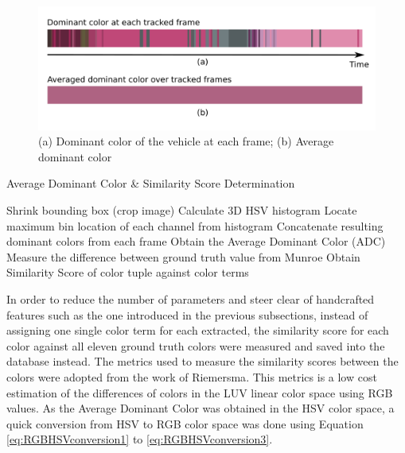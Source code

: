 \begin{figure}[hbt!]\centering
\includegraphics[width=.9\textwidth]{image/general/ADC.png}
\caption{(a) Dominant color of the vehicle at each frame; (b) Average dominant color}
\label{fig:ADC}
\end{figure}




\begin{algorithm}[!h]
  \caption{Average Dominant Color \& Similarity Score Determination}
  \label{algo:ADC}
  \begin{algorithmic}[1]
        \State Shrink bounding box (crop image)
        \State Calculate 3D HSV histogram
        \State Locate maximum bin location of each channel from histogram
        \State Concatenate resulting dominant colors from each frame
        \State Obtain the Average Dominant Color (ADC)
        \State Measure the difference between ground truth value from Munroe \cite{munroe2010color} 
        \State Obtain Similarity Score of color tuple against color terms
    \EndFor
  \end{algorithmic}
\end{algorithm}





In order to reduce the number of parameters and steer clear of handcrafted features such as the one introduced in the previous subsections, instead of assigning one single color term for each extracted, the similarity score for each color against all eleven ground truth colors were measured and saved into the database instead. The metrics used to measure the similarity scores between the colors were adopted from the work of Riemersma\cite{riemersma}. This metrics is a low cost estimation of the differences of colors in the LUV linear color space using RGB values. As the Average Dominant Color was obtained in the HSV color space, a quick conversion from HSV to RGB color space was done using Equation \ref{eq:RGBHSVconversion1} to \ref{eq:RGBHSVconversion3}. 


